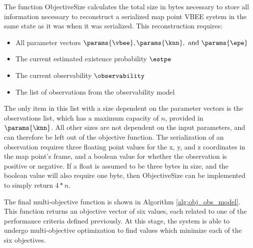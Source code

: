 The function ObjectiveSize calculates the total size in bytes necessary to store all information necessary to reconstruct a serialized map point VBEE system in the same state as it was when it was serialized. This reconstruction requires:
\begin{itemize}
    \item All parameter vectors $\params{\vbee},\params{\knn}, \text{ and } \params{\epe}$
    \item The current estimated existence probability $\estpe$
    \item The current observability $\observability$
    \item The list of observations from the observability model
\end{itemize}
The only item in this list with a size dependent on the parameter vectors is the observations list, which has a maximum capacity of $n$, provided in $\params{\knn}$. All other sizes are not dependent on the input parameters, and can therefore be left out of the objective function. The serialization of an observation requires three floating point values for the x, y, and z coordinates in the map point's frame, and a boolean value for whether the observation is positive or negative. If a float is assumed to be three bytes in size, and the boolean value will also require one byte, then ObjectiveSize can be implemented to simply return $4 * n$.

The final multi-objective function is shown in Algorithm \ref{alg:obj_obs_model}. This function returns an objective vector of six values, each related to one of the performance criteria defined previously. At this stage, the system is able to undergo multi-objective optimization to find values which minimize each of the six objectives.

